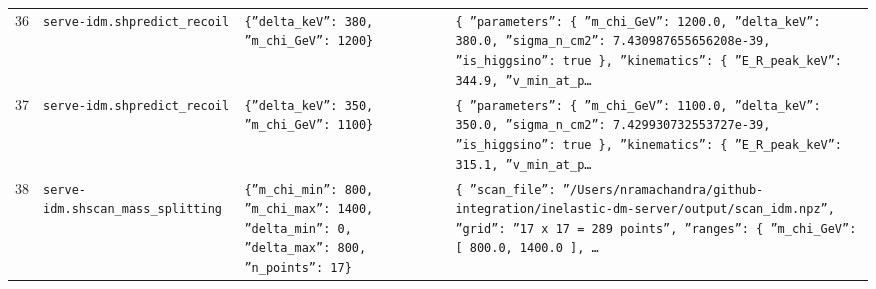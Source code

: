 \documentclass[11pt,a4paper]{article}
\begin{document}
\begin{longtable}{@{}p{}p{}p{}p{}@{}}
36 & \texttt{serve-idm.sh}\newline\texttt{predict\_\allowbreak{}recoil} & \texttt{\{''delta\_\allowbreak{}keV'':\allowbreak{} 380,\allowbreak{} ''m\_\allowbreak{}chi\_\allowbreak{}GeV'':\allowbreak{} 1200\}\allowbreak{}} & \texttt{\{   ''parameters'':\allowbreak{} \{     ''m\_\allowbreak{}chi\_\allowbreak{}GeV'':\allowbreak{} 1200.0,\allowbreak{}     ''delta\_\allowbreak{}keV'':\allowbreak{} 380.0,\allowbreak{}     ''sigma\_\allowbreak{}n\_\allowbreak{}cm2'':\allowbreak{} 7.430987655656208e-39,\allowbreak{}     ''is\_\allowbreak{}higgsino'':\allowbreak{} true   \}\allowbreak{},\allowbreak{}   ''kinematics'':\allowbreak{} \{     ''E\_\allowbreak{}R\_\allowbreak{}peak\_\allowbreak{}keV'':\allowbreak{} 344.9,\allowbreak{}     ''v\_\allowbreak{}min\_\allowbreak{}at\_\allowbreak{}p\ldots{}\allowbreak{}} \\
37 & \texttt{serve-idm.sh}\newline\texttt{predict\_\allowbreak{}recoil} & \texttt{\{''delta\_\allowbreak{}keV'':\allowbreak{} 350,\allowbreak{} ''m\_\allowbreak{}chi\_\allowbreak{}GeV'':\allowbreak{} 1100\}\allowbreak{}} & \texttt{\{   ''parameters'':\allowbreak{} \{     ''m\_\allowbreak{}chi\_\allowbreak{}GeV'':\allowbreak{} 1100.0,\allowbreak{}     ''delta\_\allowbreak{}keV'':\allowbreak{} 350.0,\allowbreak{}     ''sigma\_\allowbreak{}n\_\allowbreak{}cm2'':\allowbreak{} 7.429930732553727e-39,\allowbreak{}     ''is\_\allowbreak{}higgsino'':\allowbreak{} true   \}\allowbreak{},\allowbreak{}   ''kinematics'':\allowbreak{} \{     ''E\_\allowbreak{}R\_\allowbreak{}peak\_\allowbreak{}keV'':\allowbreak{} 315.1,\allowbreak{}     ''v\_\allowbreak{}min\_\allowbreak{}at\_\allowbreak{}p\ldots{}\allowbreak{}} \\
38 & \texttt{serve-idm.sh}\newline\texttt{scan\_\allowbreak{}mass\_\allowbreak{}splitting} & \texttt{\{''m\_\allowbreak{}chi\_\allowbreak{}min'':\allowbreak{} 800,\allowbreak{} ''m\_\allowbreak{}chi\_\allowbreak{}max'':\allowbreak{} 1400,\allowbreak{} ''delta\_\allowbreak{}min'':\allowbreak{} 0,\allowbreak{} ''delta\_\allowbreak{}max'':\allowbreak{} 800,\allowbreak{} ''n\_\allowbreak{}points'':\allowbreak{} 17\}\allowbreak{}} & \texttt{\{   ''scan\_\allowbreak{}file'':\allowbreak{} ''/\allowbreak{}Users/\allowbreak{}nramachandra/\allowbreak{}github-integration/\allowbreak{}inelastic-dm-server/\allowbreak{}output/\allowbreak{}scan\_\allowbreak{}idm.npz'',\allowbreak{}   ''grid'':\allowbreak{} ''17 x 17 =\allowbreak{} 289 points'',\allowbreak{}   ''ranges'':\allowbreak{} \{     ''m\_\allowbreak{}chi\_\allowbreak{}GeV'':\allowbreak{} [       800.0,\allowbreak{}       1400.0     ]\allowbreak{},\allowbreak{}  \ldots{}\allowbreak{}} \\

\end{longtable}
\end{document}
